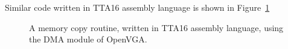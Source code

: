 Similar code written in TTA16 assembly language is shown in
Figure~\ref{TTAPROG_TTA16_memcpy}

\begin{figure}[h!]
\begin{center}
\footnotesize

\normalsize
\caption[TTA16 Assembly `memcpy' Example]{A memory copy routine, written in
TTA16 assembly language, using the DMA module of OpenVGA.}
\label{TTAPROG_TTA16_memcpy}
\end{center}
\end{figure}
